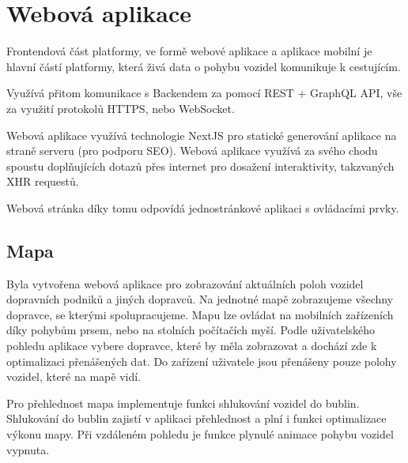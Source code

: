 \section{Webová aplikace}

Frontendová část platformy, ve formě webové aplikace a aplikace mobilní je hlavní částí platformy, která živá data o pohybu vozidel komunikuje k cestujícím.

Využívá přitom komunikace s Backendem za pomocí REST + GraphQL API, vše za využití protokolů HTTPS, nebo WebSocket.

Webová aplikace využívá technologie NextJS pro statické generování aplikace na straně serveru (pro podporu SEO).
Webová aplikace využívá za svého chodu spoustu doplňujících dotazů přes internet pro dosažení interaktivity, takzvaných XHR requestů.

Webová stránka díky tomu odpovídá jednostránkové aplikaci s ovládacími prvky.

\subsection{Mapa}
Byla vytvořena webová aplikace pro zobrazování aktuálních poloh vozidel dopravních podniků a jiných dopravců.
Na jednotné mapě zobrazujeme všechny dopravce, se kterými spolupracujeme.
Mapu lze ovládat na mobilních zařízeních díky pohybům prsem, nebo na stolních počítačích myší. Podle uživatelského pohledu aplikace vybere dopravce, které by měla zobrazovat a dochází zde k optimalizaci přenášených dat. Do zařízení uživatele jsou přenášeny pouze polohy vozidel, které na mapě vidí.

Pro přehlednost mapa implementuje funkci shlukování vozidel do bublin. Shlukování do bublin zajistí v aplikaci přehlednost a plní i funkci optimalizace výkonu mapy.
Při vzdáleném pohledu je funkce plynulé animace pohybu vozidel vypnuta.

